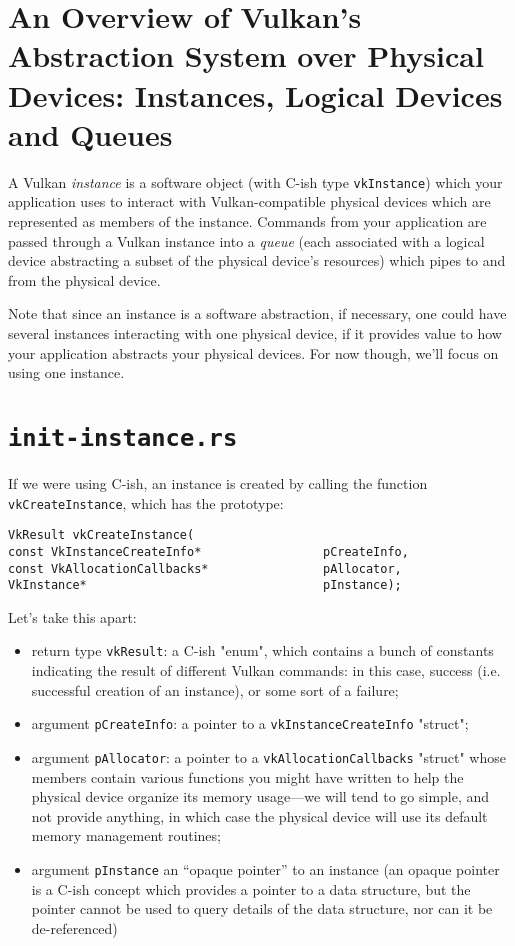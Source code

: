 \documentclass[12pt,letterpaper]{article}
\newcommand{\inquotes}[1]{``#1''}	%
\newcommand{\cil}[1]{\texttt{#1}}
\begin{document}
\section{An Overview of Vulkan's Abstraction System over Physical Devices: Instances, Logical Devices and Queues}

A Vulkan \emph{instance} is a software object (with C-ish type \cil{vkInstance}) which your application uses to interact with Vulkan-compatible physical devices which are represented as members of the instance. Commands from your application are passed through a Vulkan instance into a \emph{queue} (each associated with a logical device abstracting a subset of the physical device's resources) which pipes to and from the physical device. 

Note that since an instance is a software abstraction, if necessary, one could have several instances interacting with one physical device, if it provides value to how your application abstracts your physical devices. For now though, we'll focus on using one instance.
	
\section{\texttt{init-instance.rs}}
	
	If we were using C-ish, an instance is created by calling the function \cil{vkCreateInstance}, which has the prototype:
		\begin{verbatim}
VkResult vkCreateInstance(
const VkInstanceCreateInfo*                 pCreateInfo,
const VkAllocationCallbacks*                pAllocator,
VkInstance*                                 pInstance);
		\end{verbatim}
		
	Let's take this apart:
		\begin{itemize}
			\item return type \cil{vkResult}: a C-ish "enum", which contains a bunch of  constants indicating the result of different Vulkan commands: in this case, success (i.e. successful creation of an instance), or some sort of a failure;
			
			\item argument \cil{pCreateInfo}: a pointer to a \cil{vkInstanceCreateInfo} "struct";
			
			\item argument \cil{pAllocator}: a pointer to a \cil{vkAllocationCallbacks} "struct" whose members contain various functions you might have written to help the physical device organize its memory usage---we will tend to go simple, and not provide anything, in which case the physical device will use its default memory management routines;
			
			\item argument \cil{pInstance} an \inquotes{opaque pointer} to an instance (an opaque pointer is a C-ish concept which provides a pointer to a data structure, but the pointer cannot be used to query details of the data structure, nor can it be de-referenced)
		\end{itemize}
	
\end{document}
